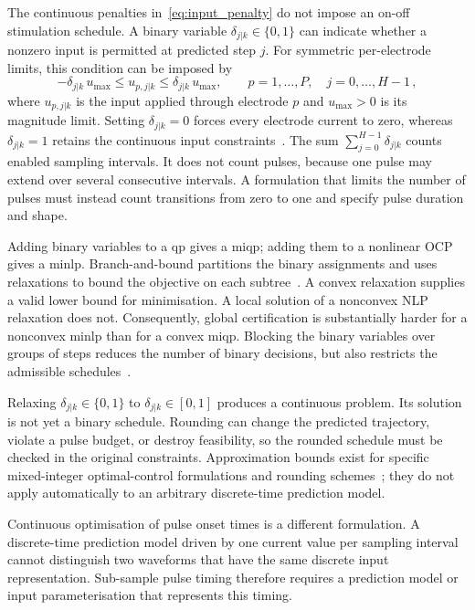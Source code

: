 The continuous penalties in~\eqref{eq:input_penalty} do not impose an on-off stimulation
schedule. A binary variable $\delta_{j|k} \in \{0, 1\}$ can indicate whether a nonzero
input is permitted at predicted step $j$. For symmetric per-electrode limits, this condition
can be imposed by
%
\begin{equation*}
    -\delta_{j|k} \, u_\mathrm{max} \leq u_{p,j|k} \leq \delta_{j|k} \, u_\mathrm{max},
    \qquad p = 1, \dots, P, \quad j = 0, \dots, H-1 \,,
\end{equation*}
%
where $u_{p,j|k}$ is the input applied through electrode $p$ and $u_\mathrm{max}>0$ is its
magnitude limit. Setting $\delta_{j|k}=0$ forces every electrode current to zero, whereas
$\delta_{j|k}=1$ retains the continuous input constraints~\cite{Bemporad1999}. The sum %
$\sum_{j=0}^{H-1}\delta_{j|k}$ counts enabled sampling intervals. It does not count pulses,
because one pulse may extend over several consecutive intervals. A formulation that limits
the number of pulses must instead count transitions from zero to one and specify pulse
duration and shape.

Adding binary variables to a \ac{qp} gives a \ac{miqp}; adding them to a nonlinear OCP gives
a \ac{minlp}. Branch-and-bound partitions the binary assignments and uses relaxations to
bound the objective on each subtree~\cite{Belotti2013}. A convex relaxation supplies a valid %
lower bound for minimisation. A local solution of a nonconvex NLP relaxation does not.
Consequently, global certification is substantially harder for a nonconvex \ac{minlp} than
for a convex \ac{miqp}. Blocking the binary variables over groups of steps reduces the
number of binary decisions, but also restricts the admissible schedules~\cite{Cagienard2007}. %

Relaxing $\delta_{j|k} \in \{0, 1\}$ to $\delta_{j|k} \in [0, 1]$ produces a continuous
problem. Its solution is not yet a binary schedule. Rounding can change the predicted
trajectory, violate a pulse budget, or destroy feasibility, so the rounded schedule must be
checked in the original constraints. Approximation bounds exist for specific
mixed-integer optimal-control formulations and rounding schemes~\cite{Sager2012}; they do %
not apply automatically to an arbitrary discrete-time prediction model.

Continuous optimisation of pulse onset times is a different formulation. A discrete-time
prediction model driven by one current value per sampling interval cannot distinguish two
waveforms that have the same discrete input representation. Sub-sample pulse timing therefore
requires a prediction model or input parameterisation that represents this timing.

